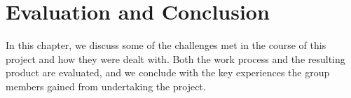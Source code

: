 \chapter{Evaluation and Conclusion}

In this chapter, we discuss some of the challenges met in the course of this
project and how they were dealt with. Both the work process and the resulting
product are evaluated, and we conclude with the key experiences the group
members gained from undertaking the project.
